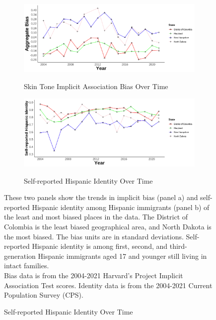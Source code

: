 \documentclass[12pt, fullpage]{article}
\newcommand{\note}[1]{\flushleft\footnotesize{#1}}
\begin{document}
\begin{figure}[H]
\begin{center}

\caption{Bias and Self-reported Hispanic Identity in the Least and Most Biased Places}

\begin{subfigure}{.9\textwidth}
\caption{Skin Tone Implicit Association Bias Over Time}
\includegraphics[width=.9\linewidth]{figure/Bias_twostates.png} 
\label{fig:skiniat}
\end{subfigure}
\begin{subfigure}{.9\textwidth}
\caption{Self-reported Hispanic Identity Over Time}
\includegraphics[width=.9\linewidth]{figure/Bias_twostates-hisp.png} 
\label{fig:hispanic-twostates}
\end{subfigure}
\flushleft\footnotesize{\note{These two panels show the trends in implicit bias (panel a) and self-reported Hispanic identity among Hispanic immigrants (panel b) of the least and most biased places in the data. The District of Colombia is the least biased geographical area, and North Dakota is the most biased. The bias units are in standard deviations. Self-reported Hispanic identity is among first, second, and third-generation Hispanic immigrants aged 17 and younger still living in intact families.}\\
\note{Bias data is from the 2004-2021 Harvard's Project Implicit Association Test scores. Identity data is from the 2004-2021 Current Population Survey (CPS).}}
\end{center}
\end{figure}
\end{document}
